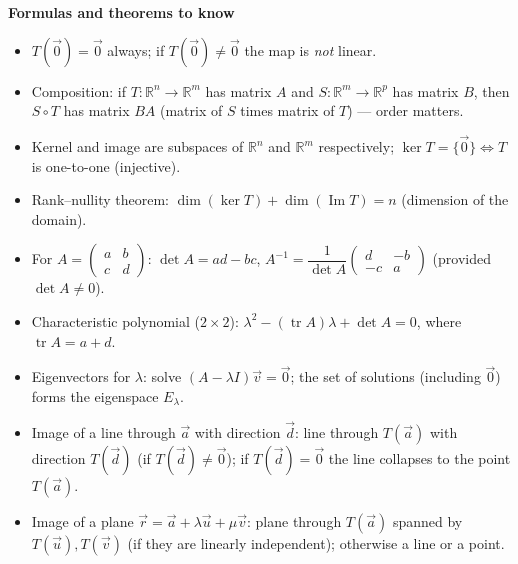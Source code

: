 \documentclass[11pt]{article}
\newcommand{\cle}[1]{{\popxbold\color{popdark}#1}}
\begin{document}
\begin{aretenir}
\textbf{Formulas and theorems to know}
\begin{itemize}
\item $T(\vec{0})=\vec{0}$ always; if $T(\vec{0})\neq\vec{0}$ the map is \emph{not} linear.
\item Composition: if $T:\mathbb{R}^{n}\to\mathbb{R}^{m}$ has matrix $A$ and $S:\mathbb{R}^{m}\to\mathbb{R}^{p}$ has matrix $B$, then $S\circ T$ has matrix $BA$ (matrix of $S$ times matrix of $T$) — order matters.
\item Kernel and image are \cle{subspaces} of $\mathbb{R}^{n}$ and $\mathbb{R}^{m}$ respectively; $\ker T=\{\vec{0}\}\iff T$ is one-to-one (injective).
\item Rank--nullity theorem: $\dim(\ker T)+\dim(\operatorname{Im}T)=n$ (dimension of the domain).
\item For $A=\begin{pmatrix}a&b\\c&d\end{pmatrix}$: $\det A=ad-bc$, $A^{-1}=\dfrac{1}{\det A}\begin{pmatrix}d&-b\\-c&a\end{pmatrix}$ (provided $\det A\neq0$).
\item Characteristic polynomial ($2\times2$): $\lambda^{2}-(\operatorname{tr}A)\lambda+\det A=0$, where $\operatorname{tr}A=a+d$.
\item Eigenvectors for $\lambda$: solve $(A-\lambda I)\vec{v}=\vec{0}$; the set of solutions (including $\vec{0}$) forms the \cle{eigenspace} $E_{\lambda}$.
\item Image of a line through $\vec{a}$ with direction $\vec{d}$: line through $T(\vec{a})$ with direction $T(\vec{d})$ (if $T(\vec{d})\neq\vec{0}$); if $T(\vec{d})=\vec{0}$ the line collapses to the point $T(\vec{a})$.
\item Image of a plane $\vec{r}=\vec{a}+\lambda\vec{u}+\mu\vec{v}$: plane through $T(\vec{a})$ spanned by $T(\vec{u}),T(\vec{v})$ (if they are linearly independent); otherwise a line or a point.
\end{itemize}


\end{aretenir}
\end{document}
